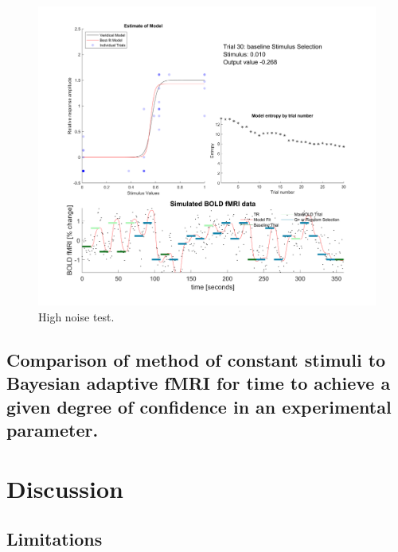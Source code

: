 \documentclass[
  english,
  man,floatsintext]{apa6}
\begin{document}
\newpage

\begin{figure}
  
  {\centering \includegraphics[width=500px]{../results/figs/figHighSimulation} 
  
  }
  
  \caption{High noise test.
\newpage}\label{fig:results-figure-highnoise}
  \end{figure}




\hypertarget{comparison-of-method-of-constant-stimuli-to-bayesian-adaptive-fmri-for-time-to-achieve-a-given-degree-of-confidence-in-an-experimental-parameter.}{%
\subsection{Comparison of method of constant stimuli to Bayesian adaptive fMRI for time to achieve a given degree of confidence in an experimental parameter.}\label{comparison-of-method-of-constant-stimuli-to-bayesian-adaptive-fmri-for-time-to-achieve-a-given-degree-of-confidence-in-an-experimental-parameter.}}

\hypertarget{discussion}{%
\section{Discussion}\label{discussion}}

\hypertarget{limitations}{%
\subsection{Limitations}\label{limitations}}
\end{document}
